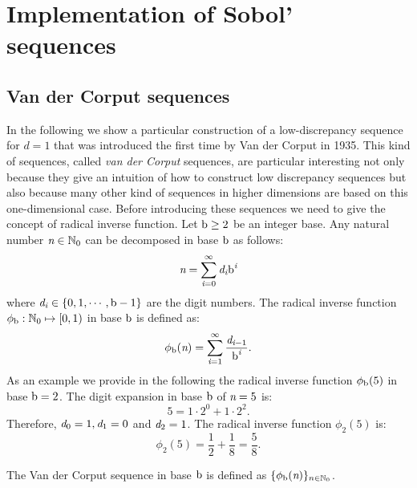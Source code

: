 \chapter{Implementation of Sobol' sequences}\label{app:Sobol}
\section{Van der Corput sequences}
 In the following we show a particular construction of a low-discrepancy sequence for $d=1$ that was introduced the first time by Van der Corput in 1935.  
This kind of sequences, called \textit{van der Corput} sequences, are particular interesting not only because they give an intuition of how to construct low discrepancy sequences but also because many other kind of sequences in higher dimensions are based on this one-dimensional case. Before introducing these sequences we need to give the concept of radical inverse function. Let $\textrm{b}\geq 2$ be an integer base. Any natural number $\textit{n}\in \mathbb{N}_0$ can be decomposed in base $\textrm{b}$ as follows:
\begin{equation}
\textit{n} = \sum_{\textit{i}=0}^\infty \textit{d}_{\textit{i}}\textrm{b}^{\textit{i}}
\end{equation}
where $\textit{d}_{\textit{i}} \in \{0, 1, \cdots, \textrm{b}-1\}$ are the digit numbers.
The radical inverse function $\phi_{\textrm{b}}:\mathbb{N}_0\mapsto [0,1)$ in base $\textrm{b}$ is defined as:
\begin{equation}
\phi_{\textrm{b}}(\textit{n}) = \sum_{\textit{i}=1}^{\infty}\frac{\textit{d}_{\textit{i}-1}}{\textrm{b}^{\textit{i}}}.
\end{equation}
As an example we provide in the following the radical inverse function $\phi_{\textrm{b}}(5)$ in base $\textrm{b} = 2$. 
The digit expansion in base $\textrm{b}$ of $\textit{n}=5$ is:
\begin{equation}
5 = 1\cdot 2^0+1\cdot 2^2.
\end{equation}
Therefore, $\textit{d}_0 = 1, \textit{d}_1 = 0$ and $\textit{d}_2 = 1$. 
The radical inverse function $\phi_2(5)$ is:
\begin{equation}
\phi_2 (5) = \frac{1}{2}+\frac{1}{8} = \frac{5}{8}.
\end{equation}
\begin{definition}
The Van der Corput sequence in base $\textrm{b}$ is defined as $\{ \phi_{\textrm{b}}(\textit{n})\}_{n\in\mathbb{N}_0}$.
\end{definition}
